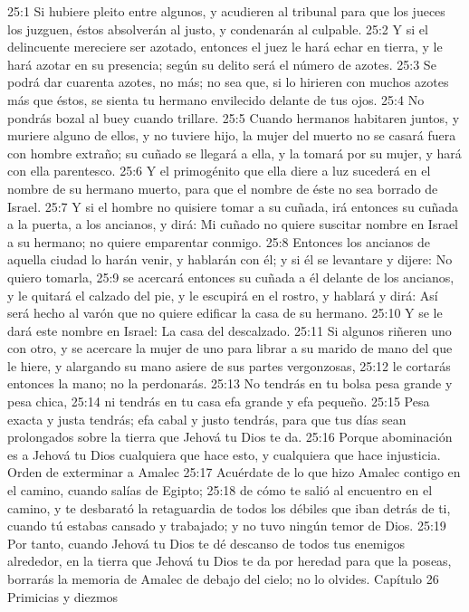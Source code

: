 25:1 Si hubiere pleito entre algunos, y acudieren al tribunal para que los jueces los juzguen, éstos absolverán al justo, y condenarán al culpable.  
25:2 Y si el delincuente mereciere ser azotado, entonces el juez le hará echar en tierra, y le hará azotar en su presencia; según su delito será el número de azotes.  
25:3 Se podrá dar cuarenta azotes, no más; no sea que, si lo hirieren con muchos azotes más que éstos, se sienta tu hermano envilecido delante de tus ojos.  
25:4 No pondrás bozal al buey cuando trillare.  
25:5 Cuando hermanos habitaren juntos, y muriere alguno de ellos, y no tuviere hijo, la mujer del muerto no se casará fuera con hombre extraño; su cuñado se llegará a ella, y la tomará por su mujer, y hará con ella parentesco.  
25:6 Y el primogénito que ella diere a luz sucederá en el nombre de su hermano muerto, para que el nombre de éste no sea borrado de Israel. 
25:7 Y si el hombre no quisiere tomar a su cuñada, irá entonces su cuñada a la puerta, a los ancianos, y dirá: Mi cuñado no quiere suscitar nombre en Israel a su hermano; no quiere emparentar conmigo.  
25:8 Entonces los ancianos de aquella ciudad lo harán venir, y hablarán con él; y si él se levantare y dijere: No quiero tomarla,  
25:9 se acercará entonces su cuñada a él delante de los ancianos, y le quitará el calzado del pie, y le escupirá en el rostro, y hablará y dirá: Así será hecho al varón que no quiere edificar la casa de su hermano.  
25:10 Y se le dará este nombre en Israel: La casa del descalzado. 
25:11 Si algunos riñeren uno con otro, y se acercare la mujer de uno para librar a su marido de mano del que le hiere, y alargando su mano asiere de sus partes vergonzosas,  
25:12 le cortarás entonces la mano; no la perdonarás.  
25:13 No tendrás en tu bolsa pesa grande y pesa chica,  
25:14 ni tendrás en tu casa efa   grande y efa pequeño.  
25:15 Pesa exacta y justa tendrás; efa   cabal y justo tendrás, para que tus días sean prolongados sobre la tierra que Jehová tu Dios te da.  
25:16 Porque abominación es a Jehová tu Dios cualquiera que hace esto, y cualquiera que hace injusticia. 
Orden de exterminar a Amalec  
25:17 Acuérdate de lo que hizo Amalec contigo en el camino, cuando salías de Egipto;  
25:18 de cómo te salió al encuentro en el camino, y te desbarató la retaguardia de todos los débiles que iban detrás de ti, cuando tú estabas cansado y trabajado; y no tuvo ningún temor de Dios.  
25:19 Por tanto, cuando Jehová tu Dios te dé descanso de todos tus enemigos alrededor, en la tierra que Jehová tu Dios te da por heredad para que la poseas, borrarás la memoria de Amalec de debajo del cielo; no lo olvides. 
Capítulo 26
Primicias y diezmos  


